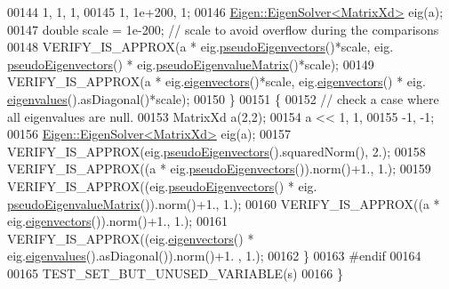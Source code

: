 \begin{DoxyCode}
00144         1,  1, 1,
00145         1, 1e+200,  1;
00146     \hyperlink{group___eigenvalues___module_class_eigen_1_1_eigen_solver}{Eigen::EigenSolver<MatrixXd>} eig(a);
00147     \textcolor{keywordtype}{double} scale = 1e-200; \textcolor{comment}{// scale to avoid overflow during the comparisons}
00148     VERIFY\_IS\_APPROX(a * eig.\hyperlink{group___eigenvalues___module_a4e796226f06e1f7347cf03a38755a155}{pseudoEigenvectors}()*scale, eig.
      \hyperlink{group___eigenvalues___module_a4e796226f06e1f7347cf03a38755a155}{pseudoEigenvectors}() * eig.\hyperlink{group___eigenvalues___module_a4979eafe0aeef06b19ada7fa5e19db17}{pseudoEigenvalueMatrix}()*scale);
00149     VERIFY\_IS\_APPROX(a * eig.\hyperlink{group___eigenvalues___module_a66288022802172e3ee059283b26201d7}{eigenvectors}()*scale, eig.\hyperlink{group___eigenvalues___module_a66288022802172e3ee059283b26201d7}{eigenvectors}() * eig.
      \hyperlink{group___eigenvalues___module_a114189009e42f5e03372a7a3dfa33b97}{eigenvalues}().asDiagonal()*scale);
00150   \}
00151   \{
00152     \textcolor{comment}{// check a case where all eigenvalues are null.}
00153     MatrixXd a(2,2);
00154     a << 1,  1,
00155         -1, -1;
00156     \hyperlink{group___eigenvalues___module_class_eigen_1_1_eigen_solver}{Eigen::EigenSolver<MatrixXd>} eig(a);
00157     VERIFY\_IS\_APPROX(eig.\hyperlink{group___eigenvalues___module_a4e796226f06e1f7347cf03a38755a155}{pseudoEigenvectors}().squaredNorm(), 2.);
00158     VERIFY\_IS\_APPROX((a * eig.\hyperlink{group___eigenvalues___module_a4e796226f06e1f7347cf03a38755a155}{pseudoEigenvectors}()).norm()+1., 1.);
00159     VERIFY\_IS\_APPROX((eig.\hyperlink{group___eigenvalues___module_a4e796226f06e1f7347cf03a38755a155}{pseudoEigenvectors}() * eig.
      \hyperlink{group___eigenvalues___module_a4979eafe0aeef06b19ada7fa5e19db17}{pseudoEigenvalueMatrix}()).norm()+1., 1.);
00160     VERIFY\_IS\_APPROX((a * eig.\hyperlink{group___eigenvalues___module_a66288022802172e3ee059283b26201d7}{eigenvectors}()).norm()+1., 1.);
00161     VERIFY\_IS\_APPROX((eig.\hyperlink{group___eigenvalues___module_a66288022802172e3ee059283b26201d7}{eigenvectors}() * eig.\hyperlink{group___eigenvalues___module_a114189009e42f5e03372a7a3dfa33b97}{eigenvalues}().asDiagonal()).norm()+1.
      , 1.);
00162   \}
00163 \textcolor{preprocessor}{#endif}
00164   
00165   TEST\_SET\_BUT\_UNUSED\_VARIABLE(s)
00166 \}
\end{DoxyCode}
